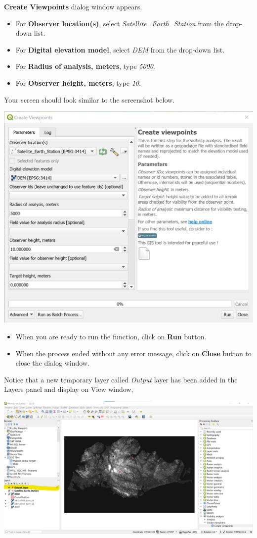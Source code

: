 \documentclass[
  letterpaper,
  DIV=11,
  numbers=noendperiod]{scrreprt}
\begin{document}
\textbf{Create Viewpoints} dialog window appears.

\begin{itemize}
\item
  For \textbf{Observer location(s)}, select
  \emph{Satellite\_Earth\_Station} from the drop-down list.
\item
  For \textbf{Digital elevation model}, select \emph{DEM} from the
  drop-down list.
\item
  For \textbf{Radius of analysis, meters}, type \emph{5000}.
\item
  For \textbf{Observer height, meters}, type \emph{10}.
\end{itemize}

Your screen should look similar to the screenshot below.

\includegraphics{./img06/image60.jpg}

\begin{itemize}
\item
  When you are ready to run the function, click on \textbf{Run} button.
\item
  When the process ended without any error message, click on
  \textbf{Close} button to close the dialog window.
\end{itemize}

Notice that a new temporary layer called \emph{Output} layer has been
added in the Layers panel and display on View window,

\includegraphics{./img06/image61.jpg}
\end{document}
